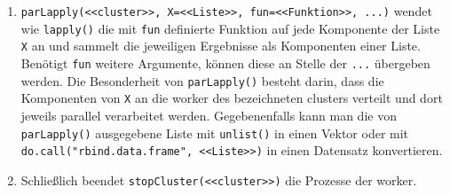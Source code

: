 \begin{enumerate}
\item \label{item:par_pla} \lstinline!parLapply(<<cluster>>, X=<<Liste>>, fun=<<Funktion>>, ...)! wendet wie \lstinline!lapply()! die mit \lstinline!fun! definierte Funktion auf jede Komponente der Liste \lstinline!X! an und sammelt die jeweiligen Ergebnisse als Komponenten einer Liste. Benötigt \lstinline!fun! weitere Argumente, können diese an Stelle der \lstinline!...! übergeben werden. Die Besonderheit von \lstinline!parLapply()! besteht darin, dass die Komponenten von \lstinline!X! an die worker des bezeichneten clusters verteilt und dort jeweils parallel verarbeitet werden. Gegebenenfalls kann man die von \lstinline!parLapply()! ausgegebene Liste mit \lstinline!unlist()! in einen Vektor oder mit \lstinline!do.call("rbind.data.frame", <<Liste>>)! in einen Datensatz konvertieren.
\item \label{item:par_sc} Schließlich beendet \lstinline!stopCluster(<<cluster>>)! die Prozesse der worker.
\end{enumerate}

